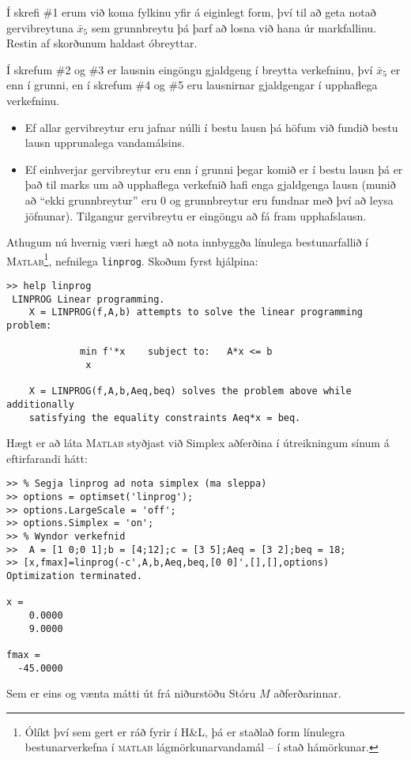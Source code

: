 \begin{lausn}
Í skrefi \#1 erum við koma fylkinu yfir á eiginlegt form, því til að \mbox{geta} notað gervibreytuna $\bar{x}_5$ sem grunnbreytu þá þarf að losna við hana úr markfallinu. Restin af skorðunum haldast óbreyttar.

Í skrefum \#2 og \#3 er lausnin eingöngu gjaldgeng í breytta verkefninu, því $\bar{x}_5$ er enn í grunni, en í skrefum \#4 og \#5 eru lausnirnar gjaldgengar í upphaflega verkefninu.
\end{lausn}

\begin{aths}\hspace{.1cm}
\begin{itemize}
\item Ef allar gervibreytur eru jafnar núlli í bestu lausn þá
  höfum við fundið bestu lausn upprunalega vandamálsins.
\item Ef einhverjar gervibreytur eru enn í grunni þegar komið er
  í bestu lausn þá er það til marks um að upphaflega verkefnið
  hafi enga gjaldgenga lausn (munið að ``ekki grunnbreytur'' eru $0$
  og grunnbreytur eru fundnar með því að leysa jöfnunar).
  Tilgangur gervibreytu er eingöngu að fá fram upphafslausn.
\end{itemize} 
\end{aths}


Athugum nú hvernig væri hægt að nota innbyggða línulega bestunarfallið í \textsc{Matlab}\footnote{Ólíkt því sem gert er ráð fyrir í H\&L, þá er staðlað form línulegra bestunarverkefna í \textsc{matlab} lágmörkunarvandamál -- í stað hámörkunar.}, nefnilega \texttt{linprog}. Skoðum fyrst hjálpina:
\begin{lstlisting}
>> help linprog
 LINPROG Linear programming.
    X = LINPROG(f,A,b) attempts to solve the linear programming problem:
         
             min f'*x    subject to:   A*x <= b 
              x
 
    X = LINPROG(f,A,b,Aeq,beq) solves the problem above while additionally
    satisfying the equality constraints Aeq*x = beq.
\end{lstlisting}

\begin{lausn}Hægt er að láta \textsc{Matlab} styðjast við Simplex aðferðina í útreikningum sínum á eftirfarandi hátt:
\begin{lstlisting}
>> % Segja linprog ad nota simplex (ma sleppa)
>> options = optimset('linprog');
>> options.LargeScale = 'off';
>> options.Simplex = 'on';
>> % Wyndor verkefnid
>>  A = [1 0;0 1];b = [4;12];c = [3 5];Aeq = [3 2];beq = 18;
>> [x,fmax]=linprog(-c',A,b,Aeq,beq,[0 0]',[],[],options)
Optimization terminated.

x =
    0.0000
    9.0000

fmax =
  -45.0000 
\end{lstlisting}
Sem er eins og vænta mátti út frá niðurstöðu Stóru $M$ aðferðarinnar.
\end{lausn} 


